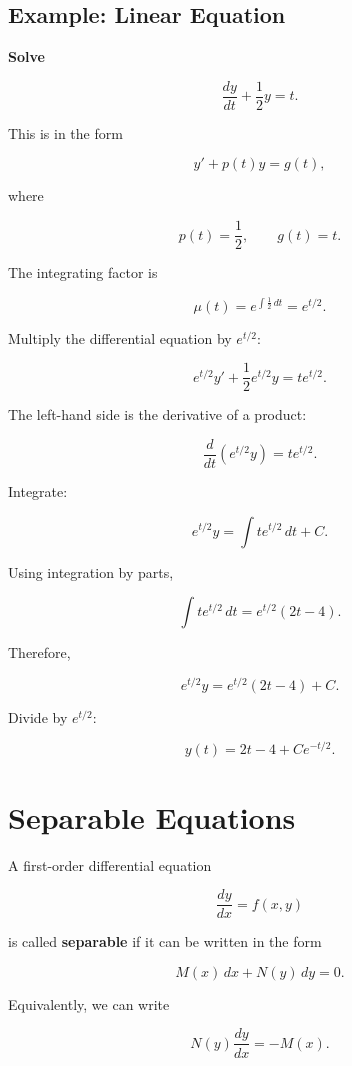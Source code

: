 \documentclass[11pt]{article}
\begin{document}
\subsection{Example: Linear Equation}

\textbf{Solve}

\[
\frac{dy}{dt}+\frac12y=t.
\]

This is in the form

\[
y'+p(t)y=g(t),
\]

where

\[
p(t)=\frac12,
\qquad
g(t)=t.
\]

The integrating factor is

\[
\mu(t)
=
e^{\int \frac12\,dt}
=
e^{t/2}.
\]

Multiply the differential equation by $e^{t/2}$:

\[
e^{t/2}y'
+
\frac12e^{t/2}y
=
te^{t/2}.
\]

The left-hand side is the derivative of a product:

\[
\frac{d}{dt}
\left(
e^{t/2}y
\right)
=
te^{t/2}.
\]

Integrate:

\[
e^{t/2}y
=
\int te^{t/2}\,dt+C.
\]

Using integration by parts,

\[
\int te^{t/2}\,dt
=
e^{t/2}(2t-4).
\]

Therefore,

\[
e^{t/2}y
=
e^{t/2}(2t-4)+C.
\]

Divide by $e^{t/2}$:

\[
\boxed{
y(t)=2t-4+Ce^{-t/2}
}.
\]

\section{Separable Equations}

A first-order differential equation

\[
\frac{dy}{dx}=f(x,y)
\]

is called \textbf{separable} if it can be written in the form

\[
M(x)\,dx+N(y)\,dy=0.
\]

Equivalently, we can write

\[
N(y)\frac{dy}{dx}=-M(x).
\]
\end{document}
